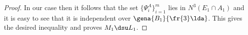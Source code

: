 \begin{proof}
In our case then it follows that the set $\{\Psi_{i}^{A}\}_{i=1}^{m}$ lies in $N^{3}(E_{1}\cap A_{1})$ and it is easy
to see that it is independent
over $\gena{B_{1}}{\fr{3}\lda}$. This gives the desired inequality and proves $M_{1}\dsu L_{1}$. 





\end{proof}
